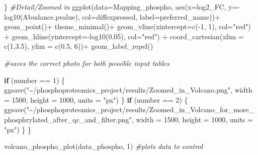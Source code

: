 \documentclass[
]{article}
\newenvironment{Shaded}{\begin{snugshade}}{\end{snugshade}}
\newcommand{\AttributeTok}[1]{\textcolor[rgb]{0.77,0.63,0.00}{#1}}
\newcommand{\CommentTok}[1]{\textcolor[rgb]{0.56,0.35,0.01}{\textit{#1}}}
\newcommand{\ControlFlowTok}[1]{\textcolor[rgb]{0.13,0.29,0.53}{\textbf{#1}}}
\newcommand{\DecValTok}[1]{\textcolor[rgb]{0.00,0.00,0.81}{#1}}
\newcommand{\FloatTok}[1]{\textcolor[rgb]{0.00,0.00,0.81}{#1}}
\newcommand{\FunctionTok}[1]{\textcolor[rgb]{0.00,0.00,0.00}{#1}}
\newcommand{\NormalTok}[1]{#1}
\newcommand{\SpecialCharTok}[1]{\textcolor[rgb]{0.00,0.00,0.00}{#1}}
\newcommand{\StringTok}[1]{\textcolor[rgb]{0.31,0.60,0.02}{#1}}
\begin{document}
\begin{Shaded}
\begin{Highlighting}[]
\NormalTok{\}}
\CommentTok{\#Detail/Zoomed in}
\FunctionTok{ggplot}\NormalTok{(}\AttributeTok{data=}\NormalTok{Mapping\_phospho, }\FunctionTok{aes}\NormalTok{(}\AttributeTok{x=}\NormalTok{log2\_FC, }\AttributeTok{y=}\SpecialCharTok{{-}}\FunctionTok{log10}\NormalTok{(Abudance.pvalue), }\AttributeTok{col=}\NormalTok{diffexpressed, }\AttributeTok{label=}\NormalTok{preferred\_name))}\SpecialCharTok{+}
  \FunctionTok{geom\_point}\NormalTok{()}\SpecialCharTok{+}
  \FunctionTok{theme\_minimal}\NormalTok{()}\SpecialCharTok{+}
  \FunctionTok{geom\_vline}\NormalTok{(}\AttributeTok{xintercept=}\FunctionTok{c}\NormalTok{(}\SpecialCharTok{{-}}\DecValTok{1}\NormalTok{, }\DecValTok{1}\NormalTok{), }\AttributeTok{col=}\StringTok{"red"}\NormalTok{) }\SpecialCharTok{+}
  \FunctionTok{geom\_hline}\NormalTok{(}\AttributeTok{yintercept=}\SpecialCharTok{{-}}\FunctionTok{log10}\NormalTok{(}\FloatTok{0.05}\NormalTok{), }\AttributeTok{col=}\StringTok{"red"}\NormalTok{) }\SpecialCharTok{+} 
  \FunctionTok{coord\_cartesian}\NormalTok{(}\AttributeTok{xlim =} \FunctionTok{c}\NormalTok{(}\DecValTok{1}\NormalTok{,}\FloatTok{3.5}\NormalTok{), }\AttributeTok{ylim =} \FunctionTok{c}\NormalTok{(}\FloatTok{0.5}\NormalTok{, }\DecValTok{6}\NormalTok{))}\SpecialCharTok{+}
  \FunctionTok{geom\_label\_repel}\NormalTok{()}

\CommentTok{\#saves the correct photo for both possible input tables}

\ControlFlowTok{if}\NormalTok{ (number }\SpecialCharTok{==} \DecValTok{1}\NormalTok{) \{}
  \FunctionTok{ggsave}\NormalTok{(}\StringTok{"\textasciitilde{}/phosphoproteomics\_project/results/Zoomed\_in\_Volcano.png"}\NormalTok{, }\AttributeTok{width =} \DecValTok{1500}\NormalTok{, }\AttributeTok{height =} \DecValTok{1000}\NormalTok{, }\AttributeTok{units =} \StringTok{"px"}\NormalTok{)}
\NormalTok{\}}
\ControlFlowTok{if}\NormalTok{ (number }\SpecialCharTok{==} \DecValTok{2}\NormalTok{) \{}
\FunctionTok{ggsave}\NormalTok{(}\StringTok{"\textasciitilde{}/phosphoproteomics\_project/results/Zoomed\_in\_Volcano\_for\_more\_phosphrylated\_after\_qc\_and\_filter.png"}\NormalTok{, }\AttributeTok{width =} \DecValTok{1500}\NormalTok{, }\AttributeTok{height =} \DecValTok{1000}\NormalTok{, }\AttributeTok{units =} \StringTok{"px"}\NormalTok{)}
\NormalTok{\}}
\NormalTok{\}}

\FunctionTok{volcano\_phospho\_plot}\NormalTok{(data\_phospho, }\DecValTok{1}\NormalTok{) }\CommentTok{\#plots data to control}
\end{Highlighting}
\end{Shaded}
\end{document}
